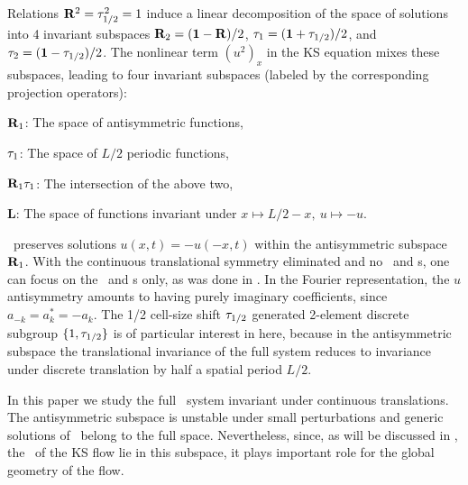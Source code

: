 Relations $\mathbf{R}^2=\tau_{1/2}^2=1$ induce a linear decomposition
of the space of solutions into 4 invariant subspaces
$\mathbf{R}_2=(\mathbf 1-\mathbf{R})/2$, $\tau_1=(\mathbf 1+\tau_{1/2})/2$, and
$\tau_2=(\mathbf 1-\tau_{1/2})/2$.  The nonlinear term $(u^2)_x$ in
the KS equation mixes these subspaces, leading
to four invariant subspaces (labeled by the
corresponding projection operators):
\begin{romannum} %
 \item[$\mathbf{R}_1$:] The space of antisymmetric functions,
 \item[$\tau_1$:] The space of $L/2$ periodic functions,
 \item[$\mathbf{R}_1 \tau_1$:] The intersection of the above two,
 \item[$\mathbf{L}$:]
The space of functions invariant under $x\mapsto L/2-x,\ u\mapsto -u$.
\end{romannum} %

%
\KSe\ preserves solutions $u(x,t)=-u(-x,t)$ within the
antisymmetric subspace $\mathbf{R}_1$.
With the continuous
translational symmetry eliminated and no
\reqva\ and \rpo s, one
can focus on the \eqva\ and \po s only, as was done
in .
In the Fourier
representation, the $u$ antisymmetry
amounts to having purely imaginary
coefficients, since $a_{-k}= a^\ast_k = -a_k$.
The 1/2 cell-size shift $\tau_{1/2}$
generated 2-element discrete subgroup
$\{1,\tau_{1/2}\}$ is
of particular interest in here,
because in the antisymmetric
subspace the translational invariance of the full system reduces to
invariance under discrete translation  by half a
spatial period $L/2$.

In
this paper we study the full \KS\ system invariant under continuous
translations.
The antisymmetric subspace is unstable
under small perturbations and generic solutions of \KSe\ belong to
the full space. Nevertheless, since, as will be discussed in
, the \eqva\ of the KS flow
lie in this subspace, it plays important role for the global
geometry of the flow.

